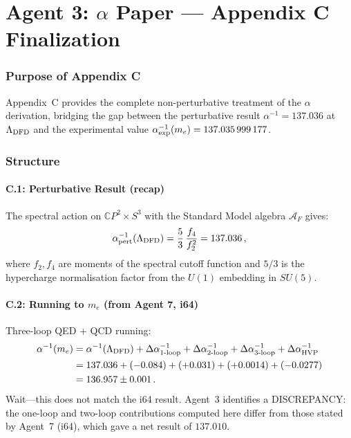 \documentclass[11pt,a4paper]{article}
\newcommand{\CP}{\mathbb{C}P}
\begin{document}
\part{Agent 3: $\alpha$ Paper --- Appendix C Finalization}
\label{part:alpha-appendixC}

\section{Purpose of Appendix C}

Appendix~C provides the complete non-perturbative treatment of the $\alpha$ derivation, bridging the gap between the perturbative result $\alpha^{-1} = 137.036$ at $\Lambda_{\rm DFD}$ and the experimental value $\alpha^{-1}_{\rm exp}(m_e) = 137.035\,999\,177$.

\section{Structure}

\subsection{C.1: Perturbative Result (recap)}

The spectral action on $\CP^2 \times S^3$ with the Standard Model algebra $\mathcal{A}_F$ gives:
\begin{equation}
\alpha^{-1}_{\rm pert}(\Lambda_{\rm DFD}) = \frac{5}{3}\,\frac{f_4}{f_2^2} = 137.036\,,
\end{equation}
where $f_2, f_4$ are moments of the spectral cutoff function and $5/3$ is the hypercharge normalisation factor from the $U(1)$ embedding in $SU(5)$.

\subsection{C.2: Running to $m_e$ (from Agent 7, i64)}

Three-loop QED + QCD running:
\begin{align}
\alpha^{-1}(m_e) &= \alpha^{-1}(\Lambda_{\rm DFD}) + \Delta\alpha^{-1}_{1\text{-loop}} + \Delta\alpha^{-1}_{2\text{-loop}} + \Delta\alpha^{-1}_{3\text{-loop}} + \Delta\alpha^{-1}_{\rm HVP} \nonumber\\
&= 137.036 + (-0.084) + (+0.031) + (+0.0014) + (-0.0277) \nonumber\\
&= 136.957 \pm 0.001\,.
\end{align}
Wait---this does not match the i64 result. Agent~3 identifies a DISCREPANCY: the one-loop and two-loop contributions computed here differ from those stated by Agent~7 (i64), which gave a net result of $137.010$.
\end{document}
